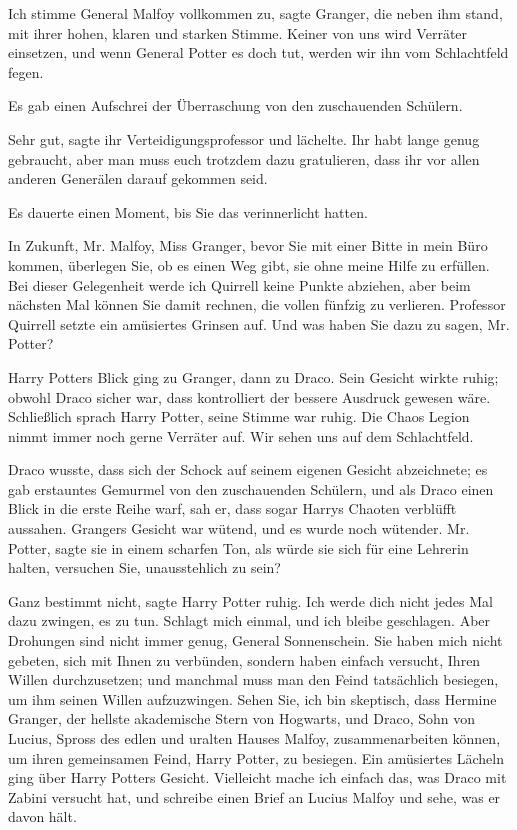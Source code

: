 \glqq{}Ich stimme General Malfoy vollkommen zu\grqq{}, sagte Granger, die neben
ihm stand, mit ihrer hohen, klaren und starken Stimme. \glqq{}Keiner von uns wird
Verräter einsetzen, und wenn General Potter es doch tut, werden wir ihn vom
Schlachtfeld fegen.\grqq{}

Es gab einen Aufschrei der Überraschung von den zuschauenden Schülern.

\glqq{}Sehr gut\grqq{}, sagte ihr Verteidigungsprofessor und lächelte. \glqq{}Ihr
habt lange genug gebraucht, aber man muss euch trotzdem dazu gratulieren, dass
ihr vor allen anderen Generälen darauf gekommen seid.\grqq{}

Es dauerte einen Moment, bis Sie das verinnerlicht hatten.

\glqq{}In Zukunft, Mr. Malfoy, Miss Granger, bevor Sie mit einer Bitte in mein
Büro kommen, überlegen Sie, ob es einen Weg gibt, sie ohne meine Hilfe zu
erfüllen. Bei dieser Gelegenheit werde ich Quirrell keine Punkte abziehen, aber
beim nächsten Mal können Sie damit rechnen, die vollen fünfzig zu verlieren.\grqq{}
Professor Quirrell setzte ein amüsiertes Grinsen auf. \glqq{}Und was haben Sie
dazu zu sagen, Mr. Potter?\grqq{}

Harry Potters Blick ging zu Granger, dann zu Draco. Sein Gesicht wirkte ruhig;
obwohl Draco sicher war, dass kontrolliert der bessere Ausdruck gewesen wäre.
Schließlich sprach Harry Potter, seine Stimme war ruhig. \glqq{}Die Chaos Legion
nimmt immer noch gerne Verräter auf. Wir sehen uns auf dem Schlachtfeld.\grqq{}

Draco wusste, dass sich der Schock auf seinem eigenen Gesicht abzeichnete; es
gab erstauntes Gemurmel von den zuschauenden Schülern, und als Draco einen Blick
in die erste Reihe warf, sah er, dass sogar Harrys Chaoten verblüfft aussahen.
Grangers Gesicht war wütend, und es wurde noch wütender. \glqq{}Mr.
Potter\grqq{}, sagte sie in einem scharfen Ton, als würde sie sich für eine
Lehrerin halten, \glqq{}versuchen Sie, unausstehlich zu sein?\grqq{}

\glqq{}Ganz bestimmt nicht\grqq{}, sagte Harry Potter ruhig. \glqq{}Ich werde dich
nicht jedes Mal dazu zwingen, es zu tun. Schlagt mich einmal, und ich bleibe
geschlagen. Aber Drohungen sind nicht immer genug, General Sonnenschein. Sie
haben mich nicht gebeten, sich mit Ihnen zu verbünden, sondern haben einfach
versucht, Ihren Willen durchzusetzen; und manchmal muss man den Feind
tatsächlich besiegen, um ihm seinen Willen aufzuzwingen. Sehen Sie, ich bin
skeptisch, dass Hermine Granger, der hellste akademische Stern von Hogwarts, und
Draco, Sohn von Lucius, Spross des edlen und uralten Hauses Malfoy,
zusammenarbeiten können, um ihren gemeinsamen Feind, Harry Potter, zu besiegen.\grqq{}
Ein amüsiertes Lächeln ging über Harry Potters Gesicht. \glqq{}Vielleicht mache
ich einfach das, was Draco mit Zabini versucht hat, und schreibe einen Brief an
Lucius Malfoy und sehe, was er davon hält.\grqq{}

